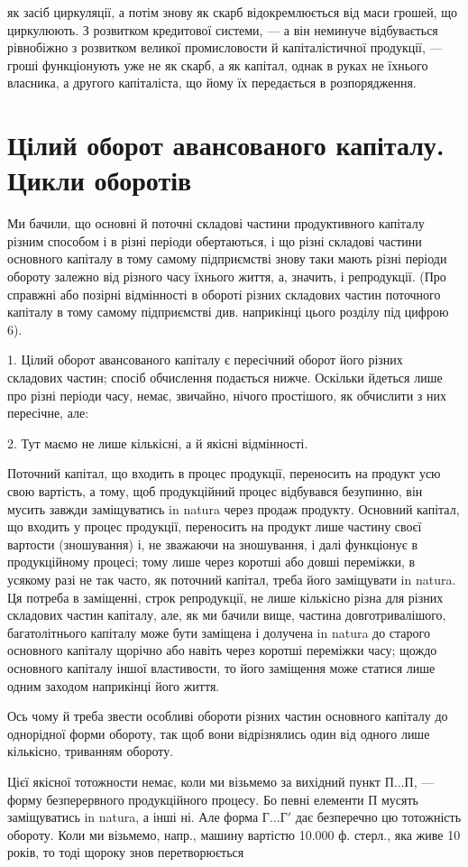 \parcont{}  %
як засіб циркуляції, а потім знову як скарб відокремлюється від маси
грошей, що циркулюють. З розвитком кредитової системи, — а він неминуче
відбувається рівнобіжно з розвитком великої промисловости й капіталістичної
продукції, — гроші функціонують уже не як скарб, а як капітал,
однак в руках не їхнього власника, а другого капіталіста, що йому
їх передається в розпорядження.

\section{Цілий оборот авансованого капіталу. Цикли
оборотів}

Ми бачили, що основні й поточні складові частини продуктивного
капіталу різним способом і в різні періоди обертаються, і що різні складові
частини основного капіталу в тому самому підприємстві знову таки
мають різні періоди обороту залежно від різного часу їхнього життя, а,
значить, і репродукції. (Про справжні або позірні відмінності в обороті
різних складових частин поточного капіталу в тому самому підприємстві
див. наприкінці цього розділу під цифрою 6).

1. Цілий оборот авансованого капіталу є пересічний оборот його різних
складових частин; спосіб обчислення подається нижче. Оскільки
йдеться лише про різні періоди часу, немає, звичайно, нічого простішого,
як обчислити з них пересічне, але:

2. Тут маємо не лише кількісні, а й якісні відмінності.

Поточний капітал, що входить в процес продукції, переносить на
продукт усю свою вартість, а тому, щоб продукційний процес відбувався
безупинно, він мусить завжди заміщуватись in natura через продаж
продукту. Основний капітал, що входить у процес продукції, переносить
на продукт лише частину своєї вартости (зношування) і, не зважаючи на
зношування, і далі функціонує в продукційному процесі; тому лише через
коротші або довші переміжки, в усякому разі не так часто, як поточний
капітал, треба його заміщувати in natura. Ця потреба в заміщенні, строк
репродукції, не лише кількісно різна для різних складових частин капіталу,
але, як ми бачили вище, частина довготривалішого, багатолітнього
капіталу може бути заміщена і долучена in natura до старого основного
капіталу щорічно або навіть через коротші переміжки часу; щождо основного
капіталу іншої властивости, то його заміщення може статися лише
одним заходом наприкінці його життя.

Ось чому й треба звести особливі обороти різних частин основного
капіталу до однорідної форми обороту, так щоб вони відрізнялись один
від одного лише кількісно, триванням обороту.

Цієї якісної тотожности немає, коли ми візьмемо за вихідний пункт
$П\dots{} П$, — форму безперервного продукційного процесу. Бо певні елементи
П мусять заміщуватись in natura, а інші ні. Але форма $Г\dots{} Г'$ дає безперечно
цю тотожність обороту. Коли ми візьмемо, напр., машину вартістю
10.000 ф. стерл., яка живе 10 років, то тоді щороку знов перетворюється
\parbreak{}  %
